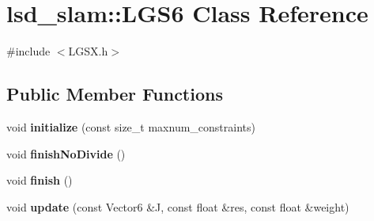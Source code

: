 \hypertarget{classlsd__slam_1_1_l_g_s6}{\section{lsd\-\_\-slam\-:\-:L\-G\-S6 Class Reference}
\label{classlsd__slam_1_1_l_g_s6}
}


{\ttfamily \#include $<$L\-G\-S\-X.\-h$>$}

\subsection*{Public Member Functions}
\begin{DoxyCompactItemize}
\item 
\hypertarget{classlsd__slam_1_1_l_g_s6_a91e91981c8eb3771922f0d350be07b1c}{void {\bfseries initialize} (const size\-\_\-t maxnum\-\_\-constraints)}\label{classlsd__slam_1_1_l_g_s6_a91e91981c8eb3771922f0d350be07b1c}

\item 
\hypertarget{classlsd__slam_1_1_l_g_s6_a174aafb481a9203f29f4201aaa80a4bc}{void {\bfseries finish\-No\-Divide} ()}\label{classlsd__slam_1_1_l_g_s6_a174aafb481a9203f29f4201aaa80a4bc}

\item 
\hypertarget{classlsd__slam_1_1_l_g_s6_a54942513c8e6a2a252770019bc1e8ebc}{void {\bfseries finish} ()}\label{classlsd__slam_1_1_l_g_s6_a54942513c8e6a2a252770019bc1e8ebc}

\item 
\hypertarget{classlsd__slam_1_1_l_g_s6_a386ed7b47af111f1aed1182f63c0c846}{void {\bfseries update} (const Vector6 \&J, const float \&res, const float \&weight)}\label{classlsd__slam_1_1_l_g_s6_a386ed7b47af111f1aed1182f63c0c846}

\end{DoxyCompactItemize}
